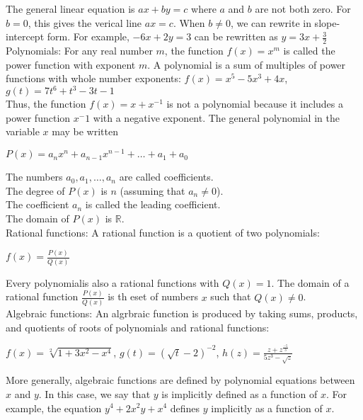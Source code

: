 \documentclass{article}
\begin{document}
The general linear equation is $ax + by = c$ where $a$ and $b$ are not both zero. For $b = 0$, this gives the verical line $ax = c$. When $b \neq 0$, we can rewrite in slope-intercept form. For example, $-6x + 2y =3$ can be rewritten as $y = 3x + \frac{3}{2}$\\

Polynomials: For any real number $m$, the function $f(x) = x^m$ is called the power function with exponent $m$. A polynomial is a sum of multiples of power functions with whole number exponents: $f(x) = x^5 -5x^3 + 4x$, $g(t) = 7t^6 +t^3 - 3t -1$\\

Thus, the function $f(x) = x + x^{-1}$ is not a polynomial because it includes a power function $x^-1$ with a negative exponent. The general polynomial in the variable $x$ may be written\\
\begin{center}$P(x) = a_nx^n + a_{n-1}x^{n-1} + \dots + a_1 + a_0$\end{center}
The numbers $a_0, a_1, \dots, a_n$ are called coefficients.\\
The degree of $P(x)$ is $n$ (assuming that $a_n \neq 0$).\\
The coefficient $a_n$ is called the leading coefficient.\\
The domain of $P(x)$ is $\mathbb{R}$.\\

Rational functions: A rational function is a quotient of two polynomials:\\
\begin{center}$f(x) = \frac{P(x)}{Q(x)}$\end{center}
Every polynomialis also a rational functions with $Q(x) = 1$. The domain of a rational function $\frac{P(x)}{Q(x)}$ is th eset of numbers $x$ such that $Q(x) \neq 0$.\\

Algebraic functions: An algrbraic function is produced by taking sums, products, and quotients of roots of polynomials and rational functions:\\
\begin{center} $f(x) = \sqrt[2]{1 + 3x^2 - x^4}$, $g(t) = (\sqrt{t} - 2)^{-2}$, $h(z) = \frac{z + z^{\frac{-5}{3}}}{5z^3 - \sqrt{z}}$\end{center}

More generally, algebraic functions are defined by polynomial equations between $x$ and $y$. In this case, we say that $y$ is implicitly defined as a function of $x$. For example, the equation $y^4 + 2x^{2}y + x^4$ defines $y$ implicitly as a function of $x$.\\
\end{document}
